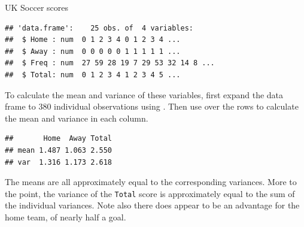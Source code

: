\documentclass[11pt]{book}
\renewenvironment{knitrout}{\small\renewcommand{\baselinestretch}{.85}}{} %
\begin{document}
\begin{Example}[soccer]{UK Soccer scores}
\begin{knitrout}
\begin{kframe}
\begin{alltt}
 \hlkwb{<-}  \hlstd{=}\hlstd{)}
 \hlkwb{<-} 
  \hlstd{\{}
   \hlkwb{<-}           
   \hlkwb{<-}           
   \hlkwb{<-}  \hlopt{+}               
  \hlstd{\})}
\end{alltt}
\begin{verbatim}
## 'data.frame':	25 obs. of  4 variables:
##  $ Home : num  0 1 2 3 4 0 1 2 3 4 ...
##  $ Away : num  0 0 0 0 0 1 1 1 1 1 ...
##  $ Freq : num  27 59 28 19 7 29 53 32 14 8 ...
##  $ Total: num  0 1 2 3 4 1 2 3 4 5 ...
\end{verbatim}
\end{kframe}
\end{knitrout}
To calculate the mean and variance of these variables, first expand
the data frame to 380 individual observations using .
Then use  over the rows to calculate the mean and variance
in each column.
\begin{knitrout}
\color{fgcolor}\begin{kframe}
\begin{alltt}
 \hlkwb{<-}    
 \hlstd{,} \hlstd{=}\hlstd{(}\hlstd{)} \hlstd{(}\hlstd{=} \hlstd{=}
\end{alltt}
\begin{verbatim}
##       Home  Away Total
## mean 1.487 1.063 2.550
## var  1.316 1.173 2.618
\end{verbatim}
\end{kframe}
\end{knitrout}

The means are all approximately equal to the corresponding variances.
More to the point, the variance of the \texttt{Total} score
is approximately equal to the sum of the individual variances.
Note also there does appear to be an advantage for the home team,
of nearly half a goal.

\end{Example}
\end{document}
